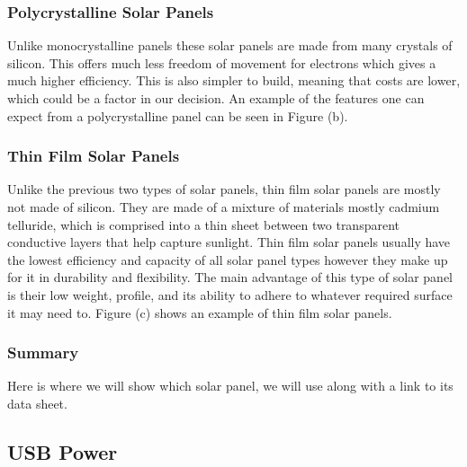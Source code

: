 \subsubsection{Polycrystalline Solar Panels}

Unlike monocrystalline panels these solar panels are made from many crystals of silicon. This offers much less freedom of movement for electrons which gives a much higher efficiency. This is also simpler to build, meaning that costs are lower, which could be a factor in our decision. An example of the features one can expect from a polycrystalline panel can be seen in Figure (b). 

\subsubsection{Thin Film Solar Panels}

Unlike the previous two types of solar panels, thin film solar panels are mostly not made of silicon. They are made of a mixture of materials mostly cadmium telluride, which is comprised into a thin sheet between two transparent conductive layers that help capture sunlight. Thin film solar panels usually have the lowest efficiency and capacity of all solar panel types however they make up for it in durability and flexibility. The main advantage of this type of solar panel is their low weight, profile, and its ability to adhere to whatever required surface it may need to. Figure (c) shows an example of thin film solar panels. 

\subsubsection{Summary}

Here is where we will show which solar panel, we will use along with a link to its data sheet. 


\subsection{USB Power}
